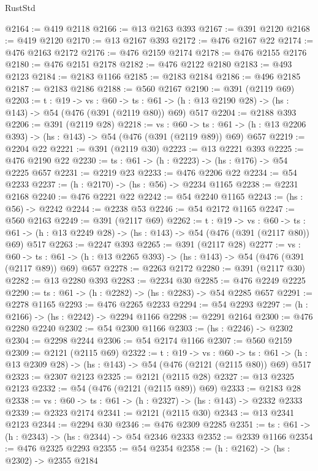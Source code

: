 \begin{lexlean}{RustStd}
\begin{coremodule}
@2164 := @419 @2118
@2166 := @13 @2163 @393
@2167 := @391 @2120
@2168 := @419 @2120
@2170 := @13 @2167 @393
@2172 := @476 @2167 @22
@2174 := @476 @2163 @2172
@2176 := @476 @2159 @2174
@2178 := @476 @2155 @2176
@2180 := @476 @2151 @2178
@2182 := @476 @2122 @2180
@2183 := @493 @2123
@2184 := @2183 @1166
@2185 := @2183 @2184
@2186 := @496 @2185
@2187 := @2183 @2186
@2188 := @560 @2167
@2190 := @391 (@2119 @69)
@2203 := {t : @19} ->
  {vs : @60} ->
  {ts : @61} -> (h : @13 @2190 @28) -> (hs : @143) -> @54 (@476 (@391 (@2119 @80)) @69) @517
@2204 := @2188 @393
@2206 := @391 (@2119 @28)
@2218 := {vs : @60} ->
  {ts : @61} -> (h : @13 @2206 @393) -> (hs : @143) -> @54 (@476 (@391 (@2119 @89)) @69) @657
@2219 := @2204 @22
@2221 := @391 (@2119 @30)
@2223 := @13 @2221 @393
@2225 := @476 @2190 @22
@2230 := {ts : @61} -> (h : @2223) -> (hs : @176) -> @54 @2225 @657
@2231 := @2219 @23
@2233 := @476 @2206 @22
@2234 := @54 @2233
@2237 := (h : @2170) -> (hs : @56) -> @2234 @1165
@2238 := @2231 @2168
@2240 := @476 @2221 @22
@2242 := @54 @2240 @1165
@2243 := (hs : @56) -> @2242
@2244 := @2238 @53
@2246 := @54 @2172 @1165
@2247 := @560 @2163
@2249 := @391 (@2117 @69)
@2262 := {t : @19} ->
  {vs : @60} ->
  {ts : @61} -> (h : @13 @2249 @28) -> (hs : @143) -> @54 (@476 (@391 (@2117 @80)) @69) @517
@2263 := @2247 @393
@2265 := @391 (@2117 @28)
@2277 := {vs : @60} ->
  {ts : @61} -> (h : @13 @2265 @393) -> (hs : @143) -> @54 (@476 (@391 (@2117 @89)) @69) @657
@2278 := @2263 @2172
@2280 := @391 (@2117 @30)
@2282 := @13 @2280 @393
@2283 := @2234 @30
@2285 := @476 @2249 @2225
@2290 := {ts : @61} -> (h : @2282) -> (hs : @2283) -> @54 @2285 @657
@2291 := @2278 @1165
@2293 := @476 @2265 @2233
@2294 := @54 @2293
@2297 := (h : @2166) -> (hs : @2242) -> @2294 @1166
@2298 := @2291 @2164
@2300 := @476 @2280 @2240
@2302 := @54 @2300 @1166
@2303 := (hs : @2246) -> @2302
@2304 := @2298 @2244
@2306 := @54 @2174 @1166
@2307 := @560 @2159
@2309 := @2121 (@2115 @69)
@2322 := {t : @19} ->
  {vs : @60} ->
  {ts : @61} -> (h : @13 @2309 @28) -> (hs : @143) -> @54 (@476 (@2121 (@2115 @80)) @69) @517
@2323 := @2307 @2123
@2325 := @2121 (@2115 @28)
@2327 := @13 @2325 @2123
@2332 := @54 (@476 (@2121 (@2115 @89)) @69)
@2333 := @2183 @28
@2338 := {vs : @60} -> {ts : @61} -> (h : @2327) -> (hs : @143) -> @2332 @2333
@2339 := @2323 @2174
@2341 := @2121 (@2115 @30)
@2343 := @13 @2341 @2123
@2344 := @2294 @30
@2346 := @476 @2309 @2285
@2351 := {ts : @61} -> (h : @2343) -> (hs : @2344) -> @54 @2346 @2333
@2352 := @2339 @1166
@2354 := @476 @2325 @2293
@2355 := @54 @2354
@2358 := (h : @2162) -> (hs : @2302) -> @2355 @2184

\end{coremodule}
\end{lexlean}

